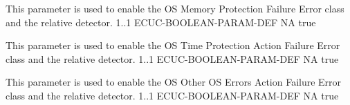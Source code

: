 {
    {This parameter is used to enable the OS Memory Protection Failure Error class and the relative detector.}
    {1..1}
    {ECUC-BOOLEAN-PARAM-DEF}
    {NA}
    {true}
}


{
    {This parameter is used to enable the OS Time Protection Action Failure Error class and the relative detector.}
    {1..1}
    {ECUC-BOOLEAN-PARAM-DEF}
    {NA}
    {true}
}


{
    {This parameter is used to enable the OS Other OS Errors Action Failure Error class and the relative detector.}
    {1..1}
    {ECUC-BOOLEAN-PARAM-DEF}
    {NA}
    {true}
}



